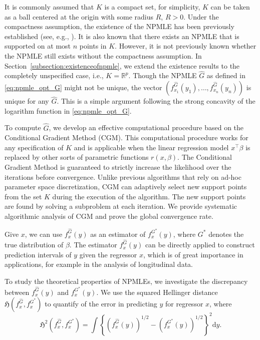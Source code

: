 \documentclass[11pt]{article}
\numberwithin{equation}{section}
\newcommand{\RS}{\mathbb{R}}
\newcommand{\T}{ \top }
\newcommand{\diff}{\mathrm{d}} %
\begin{document}
It is commonly assumed that $K$ is a compact set, for simplicity, $K$ can be taken as a ball centered at the origin with some radius $R$, $R>0$. Under the compactness assumption, the existence of the NPMLE has been previously established (see, e.g., \citet{lindsay1983geometrya}). It is also known that there exists an NPMLE that is supported on at most $n$ points in $K$. However, it is not previously known whether the NPMLE still exists without the compactness assumption. In Section~\ref{subsection:existenceofnpmle}, we extend the existence results to the completely unspecified case, i.e., $K=\RS^p$. Though the NPMLE $\hat{G}$ as defined in \eqref{eq:npmle_opt_G} might not be unique, the vector $(f_{x_1}^{\hat{G}}(y_1), \dots, f_{x_n}^{\hat{G}}(y_n))$ is unique for any $\hat{G}$. This is a simple argument following the strong concavity of the logarithm function in \eqref{eq:npmle_opt_G}.

To compute $\hat{G}$, we develop an effective computational procedure based on the Conditional Gradient Method (CGM). This computational procedure works for any specification of $K$ and is applicable when the linear regression model $x^\T \beta$ is replaced by other sorts of parametric functions $r(x,\beta)$. The Conditional Gradient Method is guaranteed to strictly increase the likelihood over the iterations before convergence. Unlike previous algorithms \citep{wu1983convergence,bohning1986vertex} that rely on ad-hoc parameter space discretization, CGM can adaptively select new support points from the set $K$ during the execution of the algorithm. The new support points are found by solving a subproblem at each iteration. We provide systematic algorithmic analysis of CGM and prove the global convergence rate. 

Give $x$, we can use $f_x^{\hat{G}}(y)$ as an estimator of $f^{G^*}_x(y)$, where $G^*$ denotes the true distribution of $\beta$. The estimator $f_x^{\hat{G}}(y)$ can be directly applied to construct prediction intervals of $y$ given the regressor $x$, which is of great importance in applications, for example in the analysis of longitudinal data.

To study the theoretical properties of NPMLEs, we investigate the discrepancy between $f_x^{\hat{G}}(y)$ and $f^{G^*}_x(y)$. We use the squared Hellinger distance $\mathfrak{H}(f^{\hat{G}}_x, f^{G^*}_x)$ to quantify of the error in predicting $y$ for regressor $x$, where 
\begin{equation}
  \mathfrak{H}^2\left(f^{\hat{G}}_x, f^{G^*}_x \right)  = \int \left\{ (f^{\hat{G}}_x(y))^{1/2} - (f^{G^*}_x(y))^{1/2} \right\}^2 \diff y. 
  \label{eq:hellinger}
\end{equation}
\end{document}
